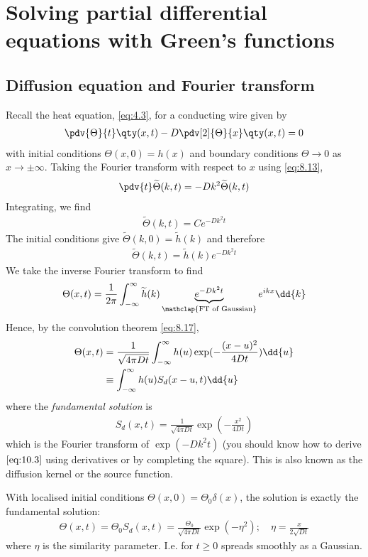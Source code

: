 \section{Solving partial differential equations with Green's functions}

\subsection{Diffusion equation and Fourier transform}
Recall the heat equation, \cref{eq:4.3}, for a conducting wire given by
\begin{align} \label{eq:10.1}
	\pdv{\Theta}{t}\qty(x,t) - D\pdv[2]{\Theta}{x}\qty(x,t) = 0
\end{align}
with initial conditions $\Theta(x,0) = h(x)$ and boundary conditions $\Theta \to 0$ as $x \to \pm \infty$.
Taking the Fourier transform with respect to $x$ using \cref{eq:8.13},
\begin{align*}
	\pdv{t} \widetilde \Theta(k,t) = -D k^2 \widetilde \Theta(k,t)
\end{align*}
Integrating, we find
\begin{align*}
	\widetilde \Theta(k,t) = C e^{-D k^2 t}
\end{align*}
The initial conditions give $\widetilde \Theta(k,0) = \widetilde h(k)$ and therefore
\begin{align*}
	\widetilde \Theta(k,t) = \widetilde h(k) e^{-Dk^2 t}
\end{align*}
We take the inverse Fourier transform to find
\begin{align*}
	\Theta(x,t) = \frac{1}{2\pi} \int_{-\infty}^\infty \widetilde h(k) \underbrace{e^{-Dk^2 t}}_{\mathclap{\text{FT of Gaussian}}} e^{ikx} \dd{k}
\end{align*}
Hence, by the convolution theorem \cref{eq:8.17},
\begin{align} \label{eq:10.2}
	\Theta(x,t) &= \frac{1}{\sqrt{4 \pi D t}} \int_{-\infty}^\infty h(u) \exp(-\frac{(x-u)^2}{4Dt}) \dd{u} \notag \\
	&\equiv \int_{-\infty}^\infty h(u) S_d(x-u,t) \dd{u}
\end{align}
where the \textit{fundamental solution} is
\begin{align} \label{eq:10.3}
	S_d(x,t) = \frac{1}{\sqrt{4 \pi D t}} \exp(-\frac{x^2}{4Dt})
\end{align}
which is the Fourier transform of $\exp(-D k^2 t)$ (you should know how to derive $\cref{eq:10.3}$ using derivatives or by completing the square).
This is also known as the diffusion kernel or the source function.
\begin{note}
	With localised initial conditions $\Theta(x,0) = \Theta_0 \delta(x)$, the solution is exactly the fundamental solution:
	\begin{align} \label{eq:10.4}
		\Theta(x,t) = \Theta_0 S_d(x,t) = \frac{\Theta_0}{\sqrt{4 \pi D t}} \exp(-\eta^2);\quad \eta = \frac{x}{2\sqrt{Dt}}
	\end{align}
	where $\eta$ is the similarity parameter.
	I.e. for $t \geq 0$ spreads smoothly as a Gaussian.
\end{note}

